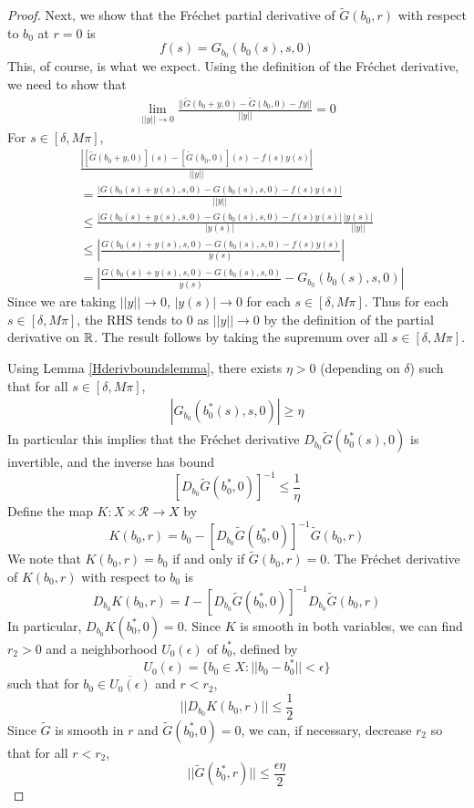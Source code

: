 \documentclass[thesis.tex]{subfiles}
\begin{document}
\begin{lemma}
\begin{proof}
Next, we show that the Fr\'echet partial derivative of $\tilde{G}(b_0,r)$ with respect to $b_0$ at $r = 0$ is 
\begin{equation}
f(s) = G_{b_0}(b_0(s), s, 0) 
\end{equation}
This, of course, is what we expect. Using the definition of the Fr\'echet derivative, we need to show that
\begin{align}
\lim_{||y|| \rightarrow 0} \frac{|| \tilde{G}(b_0 + y, 0) - \tilde{G}(b_0, 0) - fy||}{||y||} = 0
\end{align}
For $s \in [\delta, M \pi]$,
\begin{align*}
&\frac{ \left| [\tilde{G}(b_0 + y, 0)](s) - [\tilde{G}(b_0, 0)](s) - f(s) y(s) \right| }{||y||} \\
&=\frac{ \left| G(b_0(s) + y(s), s, 0) - G(b_0(s), s, 0) - f(s) y(s) \right| }{||y||} \\
&\leq \frac{\left| G(b_0(s) + y(s), s, 0) - G(b_0(s), s, 0) - f(s) y(s)\right|}{|y(s)|} \frac{|y(s)|}{||y||} \\
&\leq \left| \frac{ G(b_0(s) + y(s), s, 0) - G(b_0(s), s, 0) - f(s) y(s)}{y(s)} \right| \\
&= \left| \frac{ G(b_0(s) + y(s), s, 0) - G(b_0(s), s, 0)}{y(s)} - G_{b_0}(b_0(s), s, 0) \right|
\end{align*}
Since we are taking $||y|| \rightarrow 0$, $|y(s)| \rightarrow 0$ for each $s \in [\delta, M \pi]$. Thus for each $s \in [\delta, M \pi]$, the RHS tends to 0 as $||y|| \rightarrow 0$ by the definition of the partial derivative on ${\mathbb R}$. The result follows by taking the supremum over all $s \in [\delta, M \pi]$.

Using Lemma \ref{Hderivboundslemma}, there exists $\eta > 0$ (depending on $\delta$) such that for all $s \in [\delta, M \pi]$,
\begin{align*}
|G_{b_0}( b_0^*(s), s, 0)| \geq \eta 
\end{align*}
In particular this implies that the Fr\'echet derivative $D_{b_0} \tilde{G}(b_0^*(s), 0)$ is invertible, and the inverse has bound
\[
[D_{b_0} \tilde{G}(b_0^*, 0)]^{-1} \leq \frac{1}{\eta}
\]
Define the map $K: X \times \mathcal{R} \rightarrow X$ by
\begin{equation}\label{defKb0}
K(b_0, r) = b_0 - [D_{b_0} \tilde{G}(b_0^*, 0)]^{-1} \tilde{G}(b_0, r)
\end{equation}
We note that $K(b_0, r) = b_0$ if and only if $\tilde{G}(b_0, r) = 0$. The Fr\'echet derivative of $K(b_0, r)$ with respect to $b_0$ is 
\begin{equation}\label{DKb0}
D_{b_0} K(b_0, r) = I - [D_{b_0} \tilde{G}(b_0^*, 0)]^{-1} D_{b_0} \tilde{G}(b_0, r)
\end{equation}
In particular, $D_{b_0} K(b_0^*, 0) = 0$. Since $K$ is smooth in both variables, we can find $r_2 > 0$ and a neighborhood $U_0(\epsilon)$ of $b_0^*$, defined by
\[
U_0(\epsilon) = \{ b_0 \in X : ||b_0 -  b_0^*|| < \epsilon \}
\]
such that for $b_0 \in \overline{U_0(\epsilon)}$ and $r < r_2$,
\[
||D_{b_0} K(b_0, r)|| \leq \frac{1}{2}
\]
Since $\tilde{G}$ is smooth in $r$ and $\tilde{G}(b_0^*, 0) = 0$, we can, if necessary, decrease $r_2$ so that for all $r < r_2$,
\[
||\tilde{G}(b_0^*, r)|| \leq \frac{\epsilon \eta}{2}
\]


\end{proof}
\end{lemma}
\end{document}
